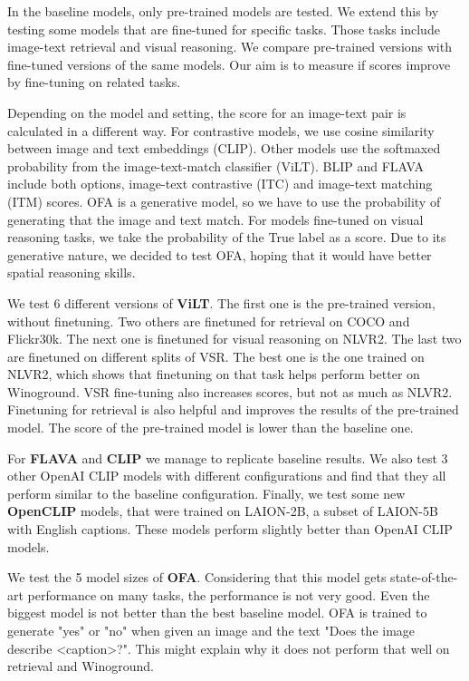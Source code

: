 In the baseline models, only pre-trained models are tested. We extend this by testing some models that are fine-tuned for specific tasks. Those tasks include image-text retrieval and visual reasoning. We compare pre-trained versions with fine-tuned versions of the same models. Our aim is to measure if scores improve by fine-tuning on related tasks.

Depending on the model and setting, the score for an image-text pair is calculated in a different way. For contrastive models, we use cosine similarity between image and text embeddings (CLIP). Other models use the softmaxed probability from the image-text-match classifier (ViLT). BLIP and FLAVA include both options, image-text contrastive (ITC) and image-text matching (ITM) scores. OFA is a generative model, so we have to use the probability of generating that the image and text match. For models fine-tuned on visual reasoning tasks, we take the probability of the True label as a score. Due to its generative nature, we decided to test OFA, hoping that it would have better spatial reasoning skills.

We test 6 different versions of \textbf{ViLT}. The first one is the pre-trained version, without finetuning. Two others are finetuned for retrieval on COCO and Flickr30k. The next one is finetuned for visual reasoning on NLVR2. The last two are finetuned on different splits of VSR. The best one is the one trained on NLVR2, which shows that finetuning on that task helps perform better on Winoground. VSR fine-tuning also increases scores, but not as much as NLVR2. Finetuning for retrieval is also helpful and improves the results of the pre-trained model. The score of the pre-trained model is lower than the baseline one.

For \textbf{FLAVA} and \textbf{CLIP} we manage to replicate baseline results. We also test 3 other OpenAI CLIP \cite{radford2021clip} models with different configurations and find that they all perform similar to the baseline configuration. Finally, we test some new \textbf{OpenCLIP} \cite{ilharco_gabriel_2021_5143773} models, that were trained on LAION-2B, a subset of LAION-5B \cite{schuhmann2022laionb} with English captions. These models perform slightly better than OpenAI CLIP models.

We test the 5 model sizes of \textbf{OFA}. Considering that this model gets state-of-the-art performance on many tasks, the performance is not very good. Even the biggest model is not better than the best baseline model. OFA is trained to generate "yes" or "no" when given an image and the text "Does the image describe <caption>?". This might explain why it does not perform that well on retrieval and Winoground.

